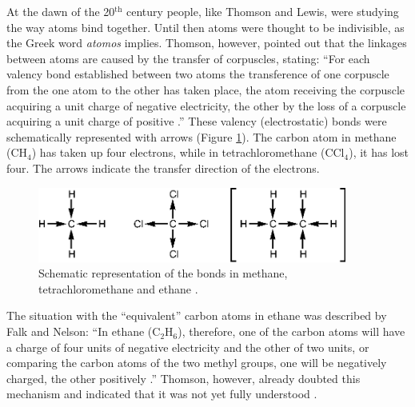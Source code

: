 At the dawn of the 20$^\mathrm{th}$ century people, like Thomson and Lewis, were studying the way atoms bind together. Until then atoms were thought to be indivisible, as the Greek word \textit{atomos} implies. Thomson, however, pointed out that the linkages between atoms are caused by the transfer of corpuscles, stating: ``For each valency bond established between two atoms the transference of one corpuscle from the one atom to the other has taken place, the atom receiving the corpuscle acquiring a unit charge of negative electricity, the other by the loss of a corpuscle acquiring a unit charge of positive \cite{thomson}.'' These valency (electrostatic) bonds were schematically represented with arrows (Figure \ref{ch1.fig1}). The carbon atom in methane (CH$_4$) has taken up four electrons, while in tetrachloromethane (CCl$_4$), it has lost four. The arrows indicate the transfer direction of the electrons. 
\begin{figure}[htdp]
\center
\includegraphics[width=4in]{introduction/figures/figure1.eps}
\caption{Schematic representation of the bonds in methane, tetrachloromethane and ethane \cite{falk}.}
\label{ch1.fig1}
\end{figure}
The situation with the ``equivalent'' carbon atoms in ethane was described by Falk and Nelson: ``In ethane (C$_2$H$_6$), therefore, one of the carbon atoms will have a charge of four units of negative electricity and the other of two units, or comparing the carbon atoms of the two methyl groups, one will be negatively charged, the other positively \cite{falk}.'' Thomson, however, already doubted this mechanism and indicated that it was not yet fully understood \cite{thomson}.


